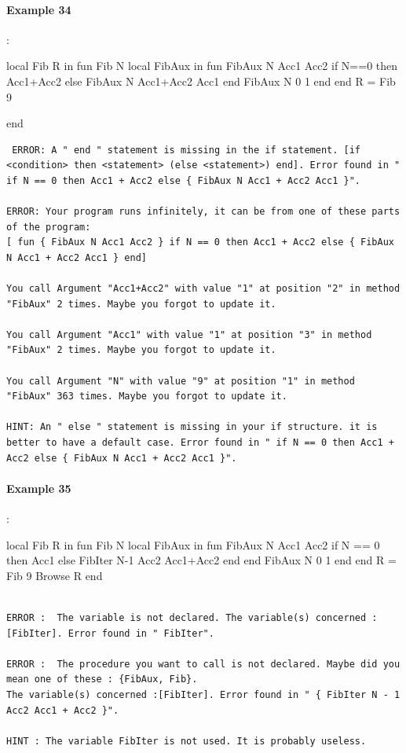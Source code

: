 \documentclass[11pt,a4paper,twoside,openright]{report}
\begin{document}
\paragraph{Example 34}:

\begin{OZ}
local Fib R in
    fun {Fib N}
        local FibAux in
            fun {FibAux N Acc1 Acc2}
				if N==0 then Acc1+Acc2
				else {FibAux N Acc1+Acc2 Acc1}			
				end
        	 {FibAux N 0 1}
		end
    	end
	R = {Fib 9}

end
\end{OZ}

\begin{lstlisting}
 ERROR: A " end " statement is missing in the if statement. [if <condition> then <statement> (else <statement>) end]. Error found in " if N == 0 then Acc1 + Acc2 else { FibAux N Acc1 + Acc2 Acc1 }".

ERROR: Your program runs infinitely, it can be from one of these parts of the program: 
[ fun { FibAux N Acc1 Acc2 } if N == 0 then Acc1 + Acc2 else { FibAux N Acc1 + Acc2 Acc1 } end] 

You call Argument "Acc1+Acc2" with value "1" at position "2" in method "FibAux" 2 times. Maybe you forgot to update it. 

You call Argument "Acc1" with value "1" at position "3" in method "FibAux" 2 times. Maybe you forgot to update it. 

You call Argument "N" with value "9" at position "1" in method "FibAux" 363 times. Maybe you forgot to update it.

HINT: An " else " statement is missing in your if structure. it is better to have a default case. Error found in " if N == 0 then Acc1 + Acc2 else { FibAux N Acc1 + Acc2 Acc1 }".
\end{lstlisting}


\paragraph{Example 35}:

\begin{OZ}
local Fib R in
    fun {Fib N}
        local FibAux in
            fun {FibAux N Acc1 Acc2}
				if N == 0 then Acc1
				else {FibIter N-1 Acc2 Acc1+Acc2} end
				end
        	 {FibAux N 0 1}
		end
    	end
	R = {Fib 9}
	{Browse R}
end
\end{OZ}

\begin{lstlisting}

ERROR :  The variable is not declared. The variable(s) concerned :[FibIter]. Error found in " FibIter".

ERROR :  The procedure you want to call is not declared. Maybe did you mean one of these : {FibAux, Fib}. 
The variable(s) concerned :[FibIter]. Error found in " { FibIter N - 1 Acc2 Acc1 + Acc2 }".

HINT : The variable FibIter is not used. It is probably useless.

\end{lstlisting}
\end{document}
